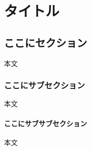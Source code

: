 \documentclass{supernova_pre}
\begin{document}
\chapter{タイトル} %
\section{ここにセクション}
本文
\subsection{ここにサブセクション}
本文
\subsubsection{ここにサブサブセクション}
本文
\end{document}
